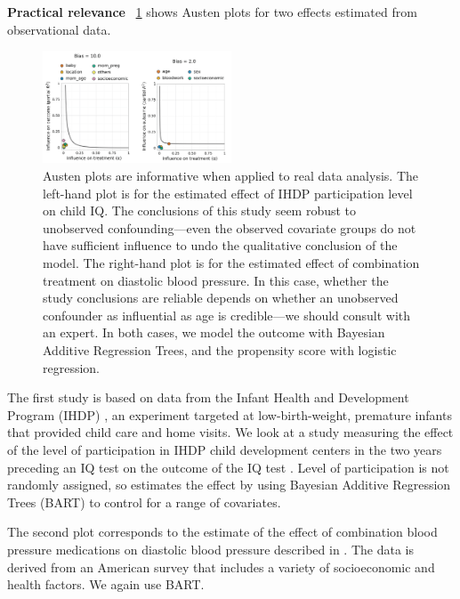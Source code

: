 \documentclass{article}
\DeclareRobustCommand{\parhead}[1]{\textbf{#1}~}
\begin{document}
\parhead{Practical relevance}
\cref{fig:real-data} shows Austen plots for two effects estimated from observational data.
\begin{figure}
  \vspace{-5pt}
  \begin{center}
    \includegraphics[width=0.5\textwidth]{figures/real-data.png}
  \end{center}
  \vspace{-5pt}
  \caption{\label{fig:real-data} Austen plots are informative when applied to real data analysis.
    The left-hand plot is for the estimated effect of IHDP participation level on child IQ.
    The conclusions of this study seem robust to unobserved confounding---even
    the observed covariate groups do not have sufficient influence to undo the qualitative conclusion of the model.
    The right-hand plot is for the estimated effect of combination treatment on diastolic blood pressure. 
    In this case, whether the study conclusions are reliable depends on whether an unobserved confounder as influential as age is credible---we should consult with an expert.
    In both cases, we model the outcome with Bayesian Additive Regression Trees, and the propensity score with logistic regression.}
  \vspace{-15pt}
\end{figure}
The first study is based on data from the Infant Health and Development Program (IHDP) \cite{BrooksGunn:Liaw:Klebanov:1992},
an experiment targeted at low-birth-weight, premature infants that provided child care and
home visits. We look at a study measuring the effect of the level of participation in
IHDP child development centers in the two years preceding an IQ test on the outcome of the IQ test \citep[][\S 6.1]{Hill:2011}.
Level of participation is not randomly assigned, so \citet{Hill:2011} estimates the effect
by using Bayesian Additive Regression Trees (BART) \cite{Chipman:George:McCulloch:2010} to control for a range of covariates.

%
%
%
%
%
%
%
%
%
%
%
%
%
%
%
 
The second plot corresponds to the estimate of the effect of combination blood pressure medications on diastolic blood pressure
described in \cite{Dorie:Harada:Carnegie:Hill:2016}. The data is derived from %
an American survey that includes a variety of socioeconomic and health factors. We again use BART.
\end{document}
